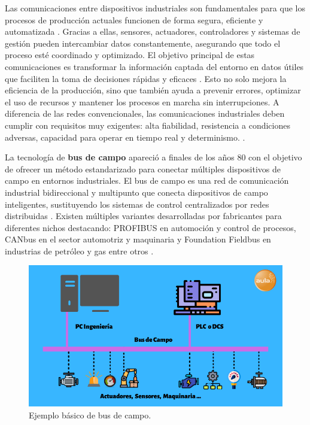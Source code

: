 Las comunicaciones entre dispositivos industriales son fundamentales para que los procesos de producción actuales funcionen de forma segura, eficiente y automatizada \cite{intro_com}. Gracias a ellas, sensores, actuadores, controladores y sistemas de gestión pueden intercambiar datos constantemente, asegurando que todo el proceso esté coordinado y optimizado. El objetivo principal de estas comunicaciones es transformar la información captada del entorno en datos útiles que faciliten la toma de decisiones rápidas y eficaces \cite{intro_com}. Esto no solo mejora la eficiencia de la producción, sino que también ayuda a prevenir errores, optimizar el uso de recursos y mantener los procesos en marcha sin interrupciones. A diferencia de las redes convencionales, las comunicaciones industriales deben cumplir con requisitos muy exigentes: alta fiabilidad, resistencia a condiciones adversas, capacidad para operar en tiempo real y determinismo. \cite{intro_com}. 

La tecnología de \textbf{bus de campo} apareció a finales de los años 80 con el objetivo de ofrecer un método estandarizado para conectar múltiples dispositivos de campo en entornos industriales. El bus de campo es una red de comunicación industrial bidireccional y multipunto que conecta dispositivos de campo inteligentes, sustituyendo los sistemas de control centralizados por redes distribuidas \cite{info_bus}. Existen múltiples variantes desarrolladas por fabricantes para diferentes nichos destacando: PROFIBUS en automoción y control de procesos, CANbus en el sector automotriz y maquinaria y Foundation Fieldbus en industrias de petróleo y gas entre otros \cite{bus_vs_ethernet}.

\begin{figure} [h!]
  \begin{center}
    \includegraphics[width=15cm]{figs/bus_de_campo}
  \end{center}
  \caption{\centering Ejemplo básico de bus de campo. \cite{info_bus}}
  \label{fig:bus_de_campo}
\end{figure} 

